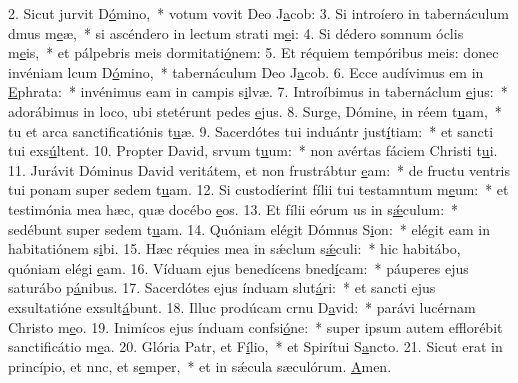2. Sicut jurvit D\uline{ó}mino,~* votum vovit Deo J\uline{a}cob:
3. Si introíero in tabernáculum dmus m\uline{e}æ,~* si ascéndero in lectum strati m\uline{e}i:
4. Si dédero somnum óclis m\uline{e}is,~* et pálpebris meis dormitati\uline{ó}nem:
5. Et réquiem tempóribus meis: donec invéniam lcum D\uline{ó}mino,~* tabernáculum Deo J\uline{a}cob.
6. Ecce audívimus em in \uline{E}phrata:~* invénimus eam in campis s\uline{i}lvæ.
7. Introíbimus in tabernáclum \uline{e}jus:~* adorábimus in loco, ubi stetérunt pedes \uline{e}jus.
8. Surge, Dómine, in réem t\uline{u}am,~* tu et arca sanctificatiónis t\uline{u}æ.
9. Sacerdótes tui induántr just\uline{í}tiam:~* et sancti tui exs\uline{ú}ltent.
10. Propter David, srvum t\uline{u}um:~* non avértas fáciem Christi t\uline{u}i.
11. Jurávit Dóminus David veritátem, et non frustrábtur \uline{e}am:~* de fructu ventris tui ponam super sedem t\uline{u}am.
12. Si custodíerint fílii tui testamntum m\uline{e}um:~* et testimónia mea hæc, quæ docébo \uline{e}os.
13. Et fílii eórum us in s\uline{ǽ}culum:~* sedébunt super sedem t\uline{u}am.
14. Quóniam elégit Dómnus S\uline{i}on:~* elégit eam in habitatiónem s\uline{i}bi.
15. Hæc réquies mea in sǽclum s\uline{ǽ}culi:~* hic habitábo, quóniam elégi \uline{e}am.
16. Víduam ejus benedícens bned\uline{í}cam:~* páuperes ejus saturábo p\uline{á}nibus.
17. Sacerdótes ejus índuam slut\uline{á}ri:~* et sancti ejus exsultatióne exsult\uline{á}bunt.
18. Illuc prodúcam crnu D\uline{a}vid:~* parávi lucérnam Christo m\uline{e}o.
19. Inimícos ejus índuam confsi\uline{ó}ne:~* super ipsum autem efflorébit sanctificátio m\uline{e}a.
20. Glória Patr, et F\uline{í}lio,~* et Spirítui S\uline{a}ncto.
21. Sicut erat in princípio, et nnc, et s\uline{e}mper,~* et in sǽcula sæculórum. \uline{A}men.
